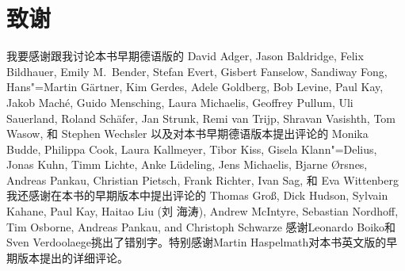 \section*{致谢}

我要感谢跟我讨论本书早期德语版的
David Adger,
Jason Baldridge, 
Felix Bildhauer, 
Emily M.\ Bender,
Stefan Evert, 
Gisbert Fanselow, 
Sandiway Fong,
Hans"=Martin Gärtner,
Kim Gerdes,
Adele Goldberg,
Bob Levine,
Paul Kay,
Jakob Maché,
Guido Mensching,
Laura Michaelis,
Geoffrey Pullum, 
Uli Sauerland, 
Roland Schäfer,
Jan Strunk,
Remi van Trijp, 
Shravan Vasishth,
Tom Wasow, 
和
Stephen Wechsler
%
以及对本书早期德语版本提出评论的
Monika Budde, 
Philippa Cook,
Laura Kallmeyer, 
Tibor Kiss,
Gisela Klann"=Delius, 
Jonas Kuhn,
Timm Lichte, %
Anke Lüdeling,
Jens Michaelis,
Bjarne Ørsnes,
Andreas Pankau,     %
Christian Pietsch,
Frank Richter,
Ivan Sag, 
和
Eva Wittenberg
%
%
我还感谢在本书的早期版本中提出评论的
Thomas Groß,
Dick Hudson,
Sylvain Kahane, 
Paul Kay,
Haitao Liu (刘 海涛),
Andrew McIntyre,
Sebastian Nordhoff,
Tim Osborne, 
Andreas Pankau, and
Christoph Schwarze
感谢Leonardo Boiko和Sven Verdoolaege挑出了错别字。特别感谢Martin Haspelmath对本书英文版的早期版本提出的详细评论。


